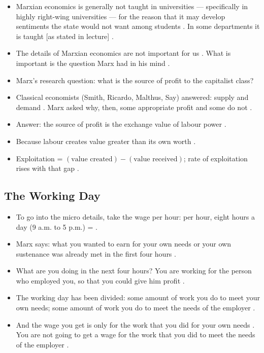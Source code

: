 \begin{CriticalPoint}
\begin{itemize}
    \item Marxian economics is generally not taught in universities --- specifically in highly right-wing universities --- for the reason that it may develop sentiments the state would not want among students . In some departments it is taught [as stated in lecture] .
    \item The details of Marxian economics are not important for us . What is important is the question Marx had in his mind .
\end{itemize}
\end{CriticalPoint}

\begin{QuickRevision}
\begin{itemize}
    \item Marx's research question: what is the source of profit to the capitalist class? 
    \item Classical economists (Smith, Ricardo, Malthus, Say) answered: supply and demand . Marx asked why, then, some appropriate profit and some do not .
    \item Answer: the source of profit is the exchange value of labour power .
    \item Because labour creates value greater than its own worth .
    \item Exploitation = $(\text{value created}) - (\text{value received})$; rate of exploitation rises with that gap .
\end{itemize}
\end{QuickRevision}

\subsection{The Working Day}
\begin{itemize}
    \item To go into the micro details, take the wage per hour:  per hour, eight hours a day (9 a.m. to 5 p.m.) =  .
    \item Marx says: what you wanted to earn for your own needs or your own sustenance was already met in the first four hours .
    \item What are you doing in the next four hours? You are working for the person who employed you, so that you could give him profit .
    \item The working day has been divided: some amount of work you do to meet your own needs; some amount of work you do to meet the needs of the employer .
    \item And the wage you get is only for the work that you did for your own needs . You are not going to get a wage for the work that you did to meet the needs of the employer .
\end{itemize}

